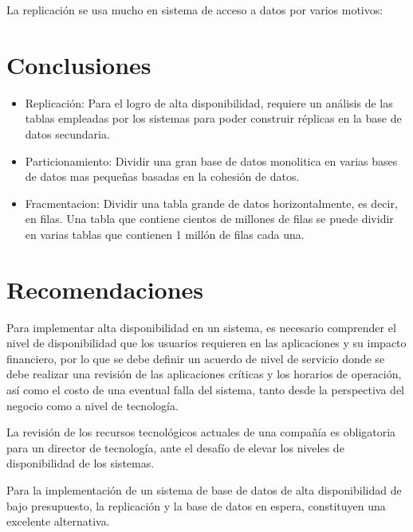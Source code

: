 \documentclass[twoside,twocolumn]{article}
\begin{document}
La replicación se usa mucho en sistema de acceso a datos por varios motivos: 
\section{Conclusiones}
   \begin{itemize}
      \item Replicación: Para  el logro de alta disponibilidad, requiere un análisis de las tablas empleadas por los  sistemas para poder construir réplicas en la base de datos secundaria. 
      \item Particionamiento: Dividir una gran base de datos monolitica en varias bases de datos mas pequeñas basadas en la cohesión de datos.
      \item Fracmentacion: Dividir una tabla grande de datos horizontalmente, es decir, en filas. Una tabla que contiene cientos de millones de filas se puede dividir en varias tablas que contienen 1 millón de filas cada una. 
   \end{itemize}
\section{Recomendaciones}
Para  implementar alta disponibilidad en un  sistema, es necesario  comprender el nivel de disponibilidad que los usuarios  requieren en las  aplicaciones y  su impacto financiero, por lo que se debe  definir un acuerdo de nivel de servicio donde se debe realizar  una revisión de   las aplicaciones críticas y los horarios de operación, así como el costo de una eventual falla del sistema, tanto desde la perspectiva del negocio como  a nivel de tecnología.  

 

La revisión de los recursos tecnológicos actuales de una compañía es obligatoria para   un director de tecnología, ante  el desafío de elevar los niveles de disponibilidad de los sistemas.  

 

Para la implementación de un sistema de base de datos de alta disponibilidad  de bajo presupuesto,   la replicación y la base de datos en espera, constituyen una excelente alternativa. 
\end{document}
